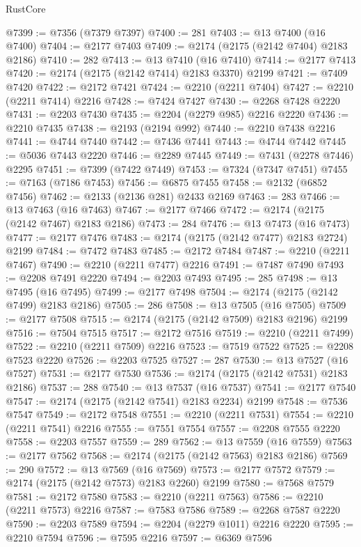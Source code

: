 \begin{lexlean}{RustCore}
\begin{coremodule}
@7399 := @7356 (@7379 @7397)
@7400 := 281
@7403 := @13 @7400 (@16 @7400)
@7404 := @2177 @7403
@7409 := @2174 (@2175 (@2142 @7404) @2183 @2186)
@7410 := 282
@7413 := @13 @7410 (@16 @7410)
@7414 := @2177 @7413
@7420 := @2174 (@2175 (@2142 @7414) @2183 @3370) @2199
@7421 := @7409 @7420
@7422 := @2172 @7421
@7424 := @2210 (@2211 @7404)
@7427 := @2210 (@2211 @7414) @2216
@7428 := @7424 @7427
@7430 := @2268 @7428 @2220
@7431 := @2203 @7430
@7435 := @2204 (@2279 @985) @2216 @2220
@7436 := @2210 @7435
@7438 := @2193 (@2194 @992)
@7440 := @2210 @7438 @2216
@7441 := @4744 @7440
@7442 := @7436 @7441
@7443 := @4744 @7442
@7445 := @5036 @7443 @2220
@7446 := @2289 @7445
@7449 := @7431 (@2278 @7446) @2295
@7451 := @7399 (@7422 @7449)
@7453 := @7324 (@7347 @7451)
@7455 := @7163 (@7186 @7453)
@7456 := @6875 @7455
@7458 := @2132 (@6852 @7456)
@7462 := @2133 (@2136 @281) @2433 @2169
@7463 := 283
@7466 := @13 @7463 (@16 @7463)
@7467 := @2177 @7466
@7472 := @2174 (@2175 (@2142 @7467) @2183 @2186)
@7473 := 284
@7476 := @13 @7473 (@16 @7473)
@7477 := @2177 @7476
@7483 := @2174 (@2175 (@2142 @7477) @2183 @2724) @2199
@7484 := @7472 @7483
@7485 := @2172 @7484
@7487 := @2210 (@2211 @7467)
@7490 := @2210 (@2211 @7477) @2216
@7491 := @7487 @7490
@7493 := @2208 @7491 @2220
@7494 := @2203 @7493
@7495 := 285
@7498 := @13 @7495 (@16 @7495)
@7499 := @2177 @7498
@7504 := @2174 (@2175 (@2142 @7499) @2183 @2186)
@7505 := 286
@7508 := @13 @7505 (@16 @7505)
@7509 := @2177 @7508
@7515 := @2174 (@2175 (@2142 @7509) @2183 @2196) @2199
@7516 := @7504 @7515
@7517 := @2172 @7516
@7519 := @2210 (@2211 @7499)
@7522 := @2210 (@2211 @7509) @2216
@7523 := @7519 @7522
@7525 := @2208 @7523 @2220
@7526 := @2203 @7525
@7527 := 287
@7530 := @13 @7527 (@16 @7527)
@7531 := @2177 @7530
@7536 := @2174 (@2175 (@2142 @7531) @2183 @2186)
@7537 := 288
@7540 := @13 @7537 (@16 @7537)
@7541 := @2177 @7540
@7547 := @2174 (@2175 (@2142 @7541) @2183 @2234) @2199
@7548 := @7536 @7547
@7549 := @2172 @7548
@7551 := @2210 (@2211 @7531)
@7554 := @2210 (@2211 @7541) @2216
@7555 := @7551 @7554
@7557 := @2208 @7555 @2220
@7558 := @2203 @7557
@7559 := 289
@7562 := @13 @7559 (@16 @7559)
@7563 := @2177 @7562
@7568 := @2174 (@2175 (@2142 @7563) @2183 @2186)
@7569 := 290
@7572 := @13 @7569 (@16 @7569)
@7573 := @2177 @7572
@7579 := @2174 (@2175 (@2142 @7573) @2183 @2260) @2199
@7580 := @7568 @7579
@7581 := @2172 @7580
@7583 := @2210 (@2211 @7563)
@7586 := @2210 (@2211 @7573) @2216
@7587 := @7583 @7586
@7589 := @2268 @7587 @2220
@7590 := @2203 @7589
@7594 := @2204 (@2279 @1011) @2216 @2220
@7595 := @2210 @7594
@7596 := @7595 @2216
@7597 := @6369 @7596

\end{coremodule}
\end{lexlean}
